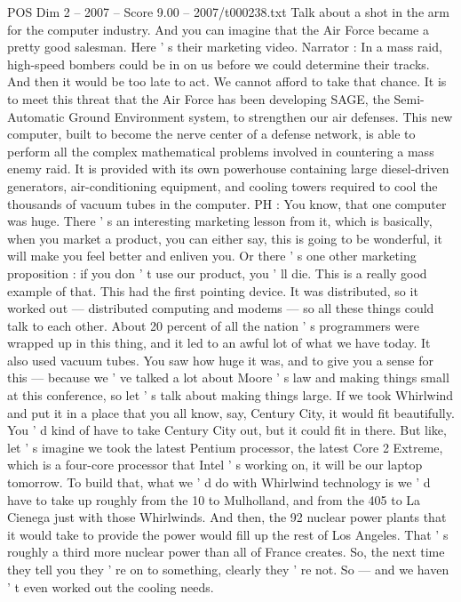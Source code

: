 \begin{textsample}{POS Dim 2 – 2007 – Score 9.00 – 2007/t000238.txt}
Talk about a shot in the arm for the computer industry.
And you can imagine that the Air Force became a pretty good salesman.
Here ' s their marketing video.
Narrator : In a mass raid, high-speed bombers could be in on us before we could determine their tracks.
And then it would be too late to act.
We cannot afford to take that chance.
It is to meet this threat that the Air Force has been developing SAGE, the Semi-Automatic Ground Environment system, to strengthen our air defenses.
This new computer, built to become the nerve center of a defense network, is able to perform all the complex mathematical problems involved in countering a mass enemy raid.
It is provided with its own powerhouse containing large diesel-driven generators, air-conditioning equipment, and cooling towers required to cool the thousands of vacuum tubes in the computer.
PH : You know, that one computer was huge.
There ' s an interesting marketing lesson from it, which is basically, when you market a product, you can either say, this is going to be wonderful, it will make you feel better and enliven you.
Or there ' s one other marketing proposition : if you don ' t use our product, you ' ll die.
This is a really good example of that.
This had the first pointing device.
It was distributed, so it worked out — distributed computing and modems — so all these things could talk to each other.
About 20 percent of all the nation ' s programmers were wrapped up in this thing, and it led to an awful lot of what we have today.
It also used vacuum tubes.
You saw how huge it was, and to give you a sense for this — because we ' ve talked a lot about Moore ' s law and making things small at this conference, so let ' s talk about making things large.
If we took Whirlwind and put it in a place that you all know, say, Century City, it would fit beautifully.
You ' d kind of have to take Century City out, but it could fit in there.
But like, let ' s imagine we took the latest Pentium processor, the latest Core 2 Extreme, which is a four-core processor that Intel ' s working on, it will be our laptop tomorrow.
To build that, what we ' d do with Whirlwind technology is we ' d have to take up roughly from the 10 to Mulholland, and from the 405 to La Cienega just with those Whirlwinds.
And then, the 92 nuclear power plants that it would take to provide the power would fill up the rest of Los Angeles.
That ' s roughly a third more nuclear power than all of France creates.
So, the next time they tell you they ' re on to something, clearly they ' re not.
So — and we haven ' t even worked out the cooling needs.

\end{textsample}
